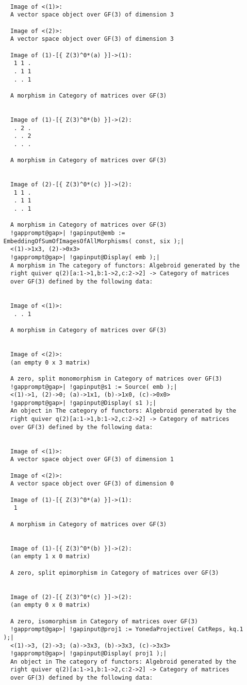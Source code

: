 \documentclass[a4paper,11pt]{report}
\begin{document}
{{{\begin{Verbatim}[commandchars=!@|,fontsize=\small,frame=single,label=Example]
  
  Image of <(1)>:
  A vector space object over GF(3) of dimension 3
  
  Image of <(2)>:
  A vector space object over GF(3) of dimension 3
  
  Image of (1)-[{ Z(3)^0*(a) }]->(1):
   1 1 .
   . 1 1
   . . 1
  
  A morphism in Category of matrices over GF(3)
  
  
  Image of (1)-[{ Z(3)^0*(b) }]->(2):
   . 2 .
   . . 2
   . . .
  
  A morphism in Category of matrices over GF(3)
  
  
  Image of (2)-[{ Z(3)^0*(c) }]->(2):
   1 1 .
   . 1 1
   . . 1
  
  A morphism in Category of matrices over GF(3)
  !gapprompt@gap>| !gapinput@emb := EmbeddingOfSumOfImagesOfAllMorphisms( const, six );|
  <(1)->1x3, (2)->0x3>
  !gapprompt@gap>| !gapinput@Display( emb );|
  A morphism in The category of functors: Algebroid generated by the
  right quiver q(2)[a:1->1,b:1->2,c:2->2] -> Category of matrices
  over GF(3) defined by the following data:
  
  
  Image of <(1)>:
   . . 1
  
  A morphism in Category of matrices over GF(3)
  
  
  Image of <(2)>:
  (an empty 0 x 3 matrix)
  
  A zero, split monomorphism in Category of matrices over GF(3)
  !gapprompt@gap>| !gapinput@s1 := Source( emb );|
  <(1)->1, (2)->0; (a)->1x1, (b)->1x0, (c)->0x0>
  !gapprompt@gap>| !gapinput@Display( s1 );|
  An object in The category of functors: Algebroid generated by the
  right quiver q(2)[a:1->1,b:1->2,c:2->2] -> Category of matrices
  over GF(3) defined by the following data:
  
  
  Image of <(1)>:
  A vector space object over GF(3) of dimension 1
  
  Image of <(2)>:
  A vector space object over GF(3) of dimension 0
  
  Image of (1)-[{ Z(3)^0*(a) }]->(1):
   1
  
  A morphism in Category of matrices over GF(3)
  
  
  Image of (1)-[{ Z(3)^0*(b) }]->(2):
  (an empty 1 x 0 matrix)
  
  A zero, split epimorphism in Category of matrices over GF(3)
  
  
  Image of (2)-[{ Z(3)^0*(c) }]->(2):
  (an empty 0 x 0 matrix)
  
  A zero, isomorphism in Category of matrices over GF(3)
  !gapprompt@gap>| !gapinput@proj1 := YonedaProjective( CatReps, kq.1 );|
  <(1)->3, (2)->3; (a)->3x3, (b)->3x3, (c)->3x3>
  !gapprompt@gap>| !gapinput@Display( proj1 );|
  An object in The category of functors: Algebroid generated by the
  right quiver q(2)[a:1->1,b:1->2,c:2->2] -> Category of matrices
  over GF(3) defined by the following data:
  

\end{Verbatim}}}}
\end{document}
